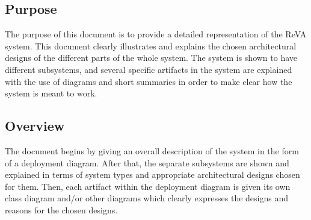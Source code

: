 \subsection{Purpose}
The purpose of this document is to provide a detailed representation of the ReVA system. This document clearly illustrates and explains the chosen architectural designs of the different parts of the whole system. The system is shown to have different subsystems, and several specific artifacts in the system are explained with the use of diagrams and short summaries in order to make clear how the system is meant to work.
\subsection{Overview}
The document begins by giving an overall description of the system in the form of a deployment diagram. After that, the separate subsystems are shown and explained in terms of system types and appropriate architectural designs chosen for them. Then, each artifact within the deployment diagram is given its own class diagram and/or other diagrams which clearly expresses the designs and reasons for the chosen designs.